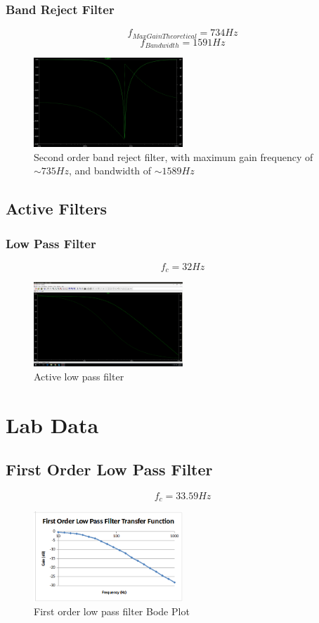 \documentclass[10pt]{article}
\begin{document}
\subsubsection*{Band Reject Filter}
$$f_{MaxGainTheoretical} = 734 Hz$$
$$f_{Bandwidth} = 1591Hz$$
\begin{figure}[H]
	\centering
	\includegraphics[width=0.5\textwidth]{PreBandReject.png}
	\caption{Second order band reject filter, with maximum gain frequency of $\sim 735Hz$, and bandwidth of $\sim 1589Hz$}
\end{figure}

\subsection*{Active Filters}
\subsubsection*{Low Pass Filter}
$$f_c = 32Hz$$
\begin{figure}[H]
	\centering
	\includegraphics[width=0.5\textwidth]{PreOpAmp.png}
	\caption{Active low pass filter}
\end{figure}

\section*{Lab Data}
\subsection*{First Order Low Pass Filter}
$$f_c = 33.59Hz$$
\begin{figure}[H]
	\centering
	\includegraphics[width=0.5\textwidth]{FirstLow.png}
	\caption{First order low pass filter Bode Plot}
\end{figure}
\end{document}
